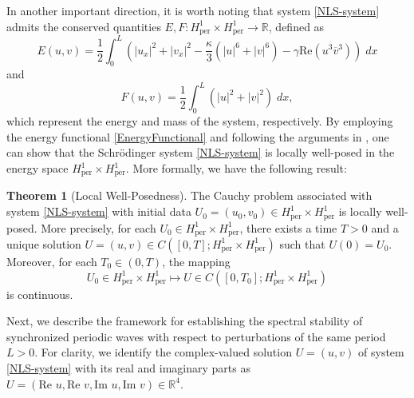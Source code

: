 \documentclass[10pt,reqno,a4paper]{amsart} %
\theoremstyle{definition} %
\numberwithin{equation}{section}
\numberwithin{figure}{section}
\newtheorem{theorem}{Theorem}[section]
\begin{document}
In another important direction, it is worth noting that system \eqref{NLS-system} admits the conserved quantities $E, F: H^1_{\text{per}} \times H^1_{\text{per}} \to \mathbb{R}$, defined as
\begin{equation}\label{EnergyFunctional}
E(u,v) = \frac{1}{2} \int_0^L \left( |u_x|^2 + |v_x|^2 - \frac{\kappa}{3} \left( |u|^6 + |v|^6 \right) - \gamma \text{Re}(u^3 \overline{v}^3) \right)\; dx
\end{equation}
and
\begin{equation}\label{MassFunctional}
F(u,v) = \frac{1}{2} \int_0^L \left( |u|^2 + |v|^2 \right) \; dx,
\end{equation}
which represent the energy and mass of the system, respectively. By employing the energy functional \eqref{EnergyFunctional} and following the arguments in \cite{Cazenave}, one can show that the Schrödinger system \eqref{NLS-system} is locally well-posed in the energy space $H^1_{\text{per}} \times H^1_{\text{per}}$. More formally, we have the following result:

\begin{theorem}[Local Well-Posedness]
The Cauchy problem associated with system \eqref{NLS-system} with initial data $U_0 = (u_0, v_0) \in H_{\text{per}}^1 \times H_{\text{per}}^1$ is locally well-posed. More precisely, for each $U_0 \in H_{\text{per}}^1 \times H_{\text{per}}^1$, there exists a time $T > 0$ and a unique solution $U = (u, v) \in C([0,T]; H_{\text{per}}^1 \times H_{\text{per}}^1)$ such that $U(0) = U_0$. Moreover, for each $T_0 \in (0,T)$, the mapping
\[
U_0 \in H_{\text{per}}^1 \times H_{\text{per}}^1 \longmapsto U \in C([0,T_0]; H_{\text{per}}^1 \times H_{\text{per}}^1)
\]
is continuous.
\end{theorem}
 
Next, we describe the framework for establishing the spectral stability of synchronized periodic waves with respect to perturbations of the same period $L>0$. For clarity, we identify the complex-valued solution $U = (u,v)$ of system \eqref{NLS-system} with its real and imaginary parts as $U = (\text{Re } u, \text{Re } v, \text{Im } u, \text{Im } v) \in \mathbb{R}^4$. 
\end{document}
